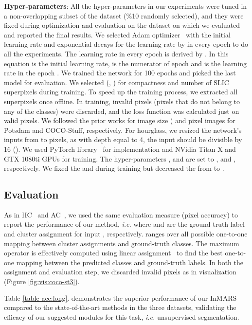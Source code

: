 \documentclass[letterpaper, 10 pt, journal, twoside]{IEEEtran}
\newcommand{\ie}{\emph{i.e.}\xspace}
\begin{document}
\textbf{Hyper-parameters}: All the hyper-parameters in our experiments were tuned in a non-overlapping subset of the dataset (\%10 randomly selected), and they were fixed during optimization and evaluation on the dataset on which we evaluated and reported the final results. We selected Adam optimizer~\cite{Adam} with the initial learning rate  and exponential decays for the learning rate by  in every epoch to do all the experiments. The learning rate in every epoch is derived by . In this equation  is the initial learning rate,  is the numerator of epoch and  is the learning rate in the epoch . We trained the network for 100 epochs and picked the last model for evaluation. We selected (, ) for compactness and number of SLIC superpixels during training. To speed up the training process, we extracted all superpixels once offline. In training, invalid pixels (pixels that do not belong to any of the classes) were discarded, and the loss function was calculated just on valid pixels. We followed the prior works for image size ( and  pixel images for Potsdam and COCO-Stuff, respectively. For hourglass, we resized the network's inputs from  to  pixels, as with depth equal to 4, the input should be divisible by 16 (). We used PyTorch library~\cite{PyTorch} for implementation and NVidia Titan X and GTX 1080ti GPUs for training. The hyper-parameters ,  and  are set to ,  and , respectively. We fixed the  and  during training but decreased the  from  to .\par

\subsection{Evaluation}
As in IIC~\cite{IIC} and AC~\cite{ARL}, we used the same evaluation measure (pixel accuracy) to report the performance of our method, \ie 
where  and  are the ground-truth label and cluster assignment for input , respectively.  ranges over all possible one-to-one mapping between cluster assignments and ground-truth classes. The maximum operator is effectively computed using linear assignment~\cite{Kuhn1955Hungarian} to find the best one-to-one mapping between the predicted classes and ground-truth labels. In both the assignment and evaluation step, we discarded invalid pixels as in visualization (Figure \ref{fig:vis:coco-st3}).

Table \ref{table-acc:long}. demonstrates the superior performance of our InMARS compared to the state-of-the-art methods in the three datasets, validating the efficacy of our suggested modules for this task, \ie unsupervised segmentation.
\end{document}
